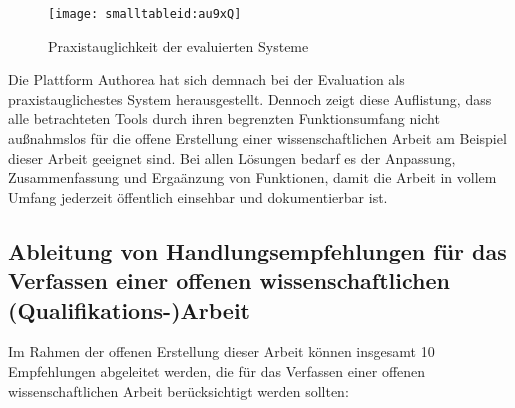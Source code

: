 \begin{itemize}
\end{itemize}

\begin{figure}[h!]
\texttt{[image: smalltableid:au9xQ]}
\caption{Praxistauglichkeit der evaluierten Systeme}
\end{figure}

Die Plattform Authorea hat sich demnach bei der Evaluation als praxistauglichestes System herausgestellt. Dennoch zeigt diese Auflistung, dass alle betrachteten Tools durch ihren begrenzten Funktionsumfang nicht außnahmslos für die offene Erstellung einer wissenschaftlichen Arbeit am Beispiel dieser Arbeit geeignet sind. Bei allen Lösungen bedarf es der Anpassung, Zusammenfassung und Ergaänzung von Funktionen, damit die Arbeit in vollem Umfang jederzeit öffentlich einsehbar und dokumentierbar ist.

\subsection{Ableitung von Handlungsempfehlungen für das Verfassen einer offenen wissenschaftlichen (Qualifikations-)Arbeit}

Im Rahmen der offenen Erstellung dieser Arbeit können insgesamt 10 Empfehlungen abgeleitet werden, die für das Verfassen einer offenen wissenschaftlichen Arbeit berücksichtigt werden sollten:

